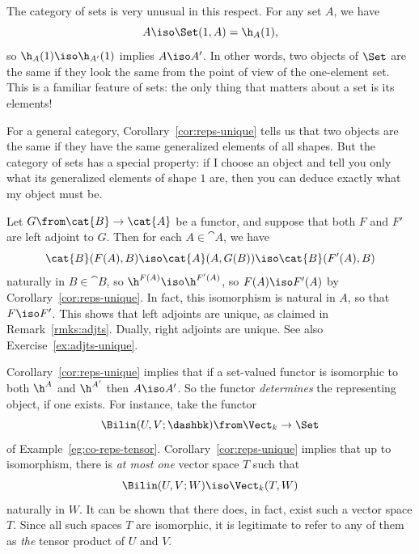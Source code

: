 \begin{example}
The category of sets is very unusual in this respect.  For any set $A$, we have
\[
A \iso \Set(1, A) = \h_A(1),
\]
so $\h_A(1) \iso \h_{A'}(1)$ implies $A \iso A'$.  In other words, two
objects of $\Set$ are the same if they look the same from the point of view
of the one-element set.  This is a familiar feature of sets: the only thing
that matters about a set is its elements!

For a general category, Corollary~\ref{cor:reps-unique} tells us that two
objects are the same if they have the same generalized%
%
%
elements of all shapes.  But the category of sets has a special property:
if I choose an object and tell you only what its generalized elements of
shape $1$ are, then you can deduce exactly what my object must be.
\end{example}

\begin{example} 
\label{eg:yon-adjts-unique}
Let $G\from \cat{B} \to \cat{A}$ be a functor, and suppose that both $F$
and $F'$ are left adjoint to $G$.  Then for each $A \in \cat{A}$, we have
\[
\cat{B}(F(A), B)
\iso
\cat{A}(A, G(B))
\iso 
\cat{B}(F'(A), B)
\]
naturally in $B \in \cat{B}$, so $\h^{F(A)} \iso \h^{F'(A)}$, so $F(A) \iso
F'(A)$ by Corollary~\ref{cor:reps-unique}.  In fact, this isomorphism is
natural in $A$, so that $F \iso F'$.  This shows that left adjoints are
unique, as claimed in Remark~\ref{rmks:adjts}.
Dually, right adjoints are unique.  See also Exercise~\ref{ex:adjts-unique}.
\end{example}

\begin{example}
Corollary~\ref{cor:reps-unique} implies that if a set-valued functor is
isomorphic to both $\h^A$ and $\h^{A'}$ then $A \iso A'$.  So the functor
\emph{determines} the representing object, if one exists.  For instance, take
the functor 
\[
\Bilin(U, V; \dashbk)\from \Vect_k \to \Set
%
\index{map!bilinear}
%
\]
of Example~\ref{eg:co-reps-tensor}.  Corollary~\ref{cor:reps-unique}
implies that up to isomorphism, there is \emph{at most one} vector space
$T$ such that
\[
\Bilin(U, V; W) \iso \Vect_k(T, W)
\]
naturally in $W$.  It can be shown that there does, in fact, exist such a
vector space $T$.  Since all such spaces $T$ are isomorphic, it is
legitimate to refer to any of them as \emph{the}%
%
%
tensor%
%
%
product of $U$ and $V$.
\end{example}
%
%

